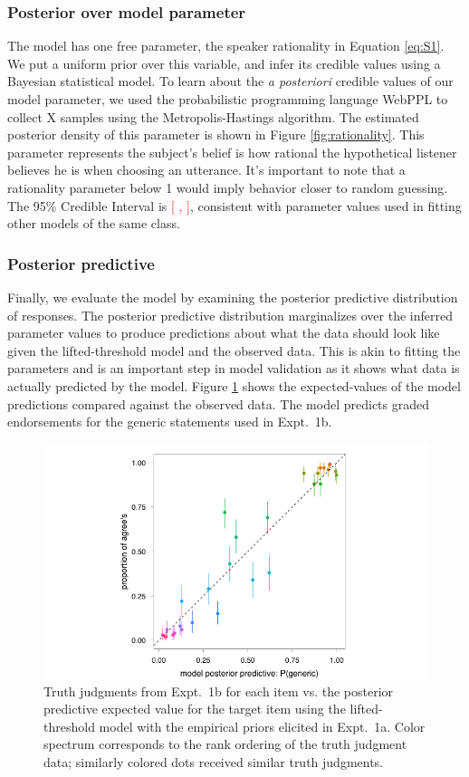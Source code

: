 \documentclass[10pt,letterpaper]{article}
\newcommand{\red}[1]{\textcolor{Red}{#1}}
\begin{document}
\subsubsection{Posterior over model parameter}
The model has one free parameter, the speaker rationality in Equation \ref{eq:S1}. We put a uniform prior over this variable, and infer its credible values using a Bayesian statistical model. To learn about the \emph{a posteriori} credible values of our model parameter, we used the probabilistic programming language WebPPL \cite{webppl} to collect X samples using the Metropolis-Hastings algorithm. The estimated posterior density of this parameter is shown in Figure \ref{fig:rationality}. This parameter represents the subject's belief is how rational the hypothetical listener believes he is when choosing an utterance. It's important to note that a rationality parameter below 1 would imply behavior closer to random guessing. The 95\% Credible Interval is \red{[ , ]}, consistent with parameter values used in fitting other models of the same class.  

\subsubsection{Posterior predictive}


Finally, we evaluate the model by examining the posterior predictive distribution of responses. The posterior predictive distribution marginalizes over the inferred parameter values to produce predictions about what the data should look like given the lifted-threshold model and the observed data. This is akin to fitting the parameters and is an important step in model validation as it shows what data is actually predicted by the model. Figure \ref{fig:modeldataScatter} shows the expected-values of the model predictions compared against the observed data. The model predicts graded endorsements for the generic statements used in Expt.~1b. 

\begin{figure}
\centering
    \includegraphics[width=0.8\columnwidth]{tj_n100_tjVsPostpred}
    \caption{Truth judgments from Expt.~1b for each item vs. the posterior predictive expected value for the target item using the lifted-threshold model with the empirical priors elicited in Expt.~1a. Color spectrum corresponds to the rank ordering of the truth judgment data; similarly colored dots received similar truth judgments.}
  \label{fig:modeldataScatter}
\end{figure}
\end{document}
